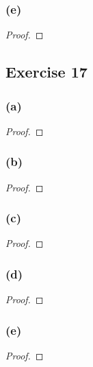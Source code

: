 \documentclass[14pt]{extarticle}
\begin{document}
\subsubsection{(e)}

\begin{proof}

\end{proof}

\subsection{Exercise 17}

\subsubsection{(a)}

\begin{proof}

\end{proof}

\subsubsection{(b)}

\begin{proof}

\end{proof}

\subsubsection{(c)}

\begin{proof}

\end{proof}

\subsubsection{(d)}

\begin{proof}

\end{proof}

\subsubsection{(e)}

\begin{proof}

\end{proof}
\end{document}
